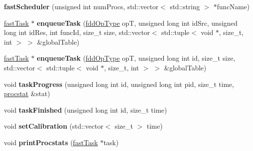 \begin{DoxyCompactItemize}
\item 
\hypertarget{classfaster_1_1fastScheduler_a5585b9363737823bf17e6782013b04a8}{}\label{classfaster_1_1fastScheduler_a5585b9363737823bf17e6782013b04a8} 
{\bfseries fast\+Scheduler} (unsigned int num\+Procs, std\+::vector$<$ std\+::string $>$ $\ast$func\+Name)
\item 
\hypertarget{classfaster_1_1fastScheduler_a25353e0b9cac5c731973ea0d453080e0}{}\label{classfaster_1_1fastScheduler_a25353e0b9cac5c731973ea0d453080e0} 
\hyperlink{classfaster_1_1fastTask}{fast\+Task} $\ast$ {\bfseries enqueue\+Task} (\hyperlink{namespacefaster_a64379512d12d41c6e58f176939abfd80}{fdd\+Op\+Type} opT, unsigned long int id\+Src, unsigned long int id\+Res, int func\+Id, size\+\_\+t size, std\+::vector$<$ std\+::tuple$<$ void $\ast$, size\+\_\+t, int $>$ $>$ \&global\+Table)
\item 
\hypertarget{classfaster_1_1fastScheduler_a3adc513709d0c00d1d6b9f62115c9284}{}\label{classfaster_1_1fastScheduler_a3adc513709d0c00d1d6b9f62115c9284} 
\hyperlink{classfaster_1_1fastTask}{fast\+Task} $\ast$ {\bfseries enqueue\+Task} (\hyperlink{namespacefaster_a64379512d12d41c6e58f176939abfd80}{fdd\+Op\+Type} opT, unsigned long int id, size\+\_\+t size, std\+::vector$<$ std\+::tuple$<$ void $\ast$, size\+\_\+t, int $>$ $>$ \&global\+Table)
\item 
\hypertarget{classfaster_1_1fastScheduler_a09db7fd6c9076e26dea68a7c925bf531}{}\label{classfaster_1_1fastScheduler_a09db7fd6c9076e26dea68a7c925bf531} 
void {\bfseries task\+Progress} (unsigned long int id, unsigned long int pid, size\+\_\+t time, \hyperlink{classfaster_1_1procstat}{procstat} \&stat)
\item 
\hypertarget{classfaster_1_1fastScheduler_af657bff84b9c117625135ca0c8f4ccf6}{}\label{classfaster_1_1fastScheduler_af657bff84b9c117625135ca0c8f4ccf6} 
void {\bfseries task\+Finished} (unsigned long int id, size\+\_\+t time)
\item 
\hypertarget{classfaster_1_1fastScheduler_a4d2aec030cd131b05c7091921545b3a4}{}\label{classfaster_1_1fastScheduler_a4d2aec030cd131b05c7091921545b3a4} 
void {\bfseries set\+Calibration} (std\+::vector$<$ size\+\_\+t $>$ time)
\item 
\hypertarget{classfaster_1_1fastScheduler_a17a44cb80cf026772647d5226ed56fcb}{}\label{classfaster_1_1fastScheduler_a17a44cb80cf026772647d5226ed56fcb} 
void {\bfseries print\+Procstats} (\hyperlink{classfaster_1_1fastTask}{fast\+Task} $\ast$task)
\item 

\end{DoxyCompactItemize}
